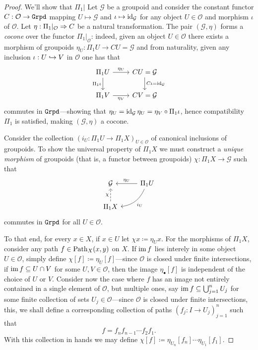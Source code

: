 \begin{proof}
We'll show that \(\Pi_1|\) Let \(\mathcal{G}\) be a groupoid and consider the
constant functor \(C: \mathcal{O} \to {\texttt{Grpd}}\) mapping \(U \mapsto \mathcal{G}\)
and \(\iota \mapsto \operatorname{id}_{\mathcal{G}}\) for any object \(U \in \mathcal{O}\) and
morphism \(\iota\) of \(\mathcal{O}\). Let \(\eta: \Pi_1|_{\mathcal{O}} \Rightarrow C\)
be a natural transformation. The pair \((\mathcal{G}, \eta)\) forms a
\emph{cocone} over the functor \(\Pi_1|_{\mathcal{O}}\): indeed, given an object
\(U \in \mathcal{O}\) there exists a morphism of groupoids
\(\eta_U: \Pi_1 U \to C U = \mathcal{G}\) and from naturality, given any
inclusion \(\iota: U \hookrightarrow V\) in \(\mathcal{O}\) one has that
\[
\begin{tikzcd}
\Pi_1 U \ar[d, "\Pi_1 \iota"'] \ar[r, "\eta_U"]
&C U = \mathcal{G} \ar[d, "C \iota = \Id_{\mathcal{G}}"] \\
\Pi_1 V \ar[r, "\eta_V"'] &C V = \mathcal{G}
\end{tikzcd}
\]
commutes in \({\texttt{Grpd}}\)---showing that
\(\eta_U = \operatorname{id}_{\mathcal{G}} \eta_U = \eta_V \circ \Pi_1 \iota\), hence
compatibility \(\Pi_1\) is satisfied, making \((\mathcal{G}, \eta)\) a cocone.

Consider the collection \((i_U: \Pi_1 U \to \Pi_1 X)_{U \in \mathcal{O}}\) of
canonical inclusions of groupoids. To show the universal property of \(\Pi_1 X\)
we must construct a \emph{unique morphism} of groupoids (that is, a functor
between groupoids) \(\chi: \Pi_1 X \to \mathcal{G}\) such that
\begin{equation}\label{eq:van-kampen-grpd}
\begin{tikzcd}
\mathcal{G} &\Pi_1 U \ar[l, "\eta_U"'] \ar[dl, bend left, "i_U"] \\
\Pi_1 X \ar[u, dashed, "\chi"] &
\end{tikzcd}
\end{equation}
commutes in \({\texttt{Grpd}}\) for all \(U \in \mathcal{O}\).

To that end, for every \(x \in X\), if \(x \in U\) let
\(\chi x \coloneq \eta_U x\). For the morphisms of \(\Pi_1 X\), consider any
path \(f \in \operatorname{Path}_X(x, y)\) on \(X\). If \(\operatorname{im} f\) lies interely in some object
\(U \in \mathcal{O}\), simply define \(\chi [f] \coloneq \eta_U [f]\)---since
\(\mathcal{O}\) is closed under finite intersections, if
\(\operatorname{im} f \subseteq U \cap V\) for some \(U, V \in \mathcal{O}\), then the image
\(\eta_{\bullet} [f]\) is independent of the choice of \(U\) or \(V\). Consider
now the case where \(f\) has an image not entirely contained in a single element
of \(\mathcal{O}\), but multiple ones, say
\(\operatorname{im} f \subseteq \bigcup_{j=1}^n U_j\) for some finite collection of sets
\(U_j \in \mathcal{O}\)---since \(\mathcal{O}\) is closed under finite
intersections, this, we shall define a corresponding collection of paths
\((f_j: I \to U_j)_{j=1}^n\) such that
\[
f = f_n f_{n-1} \cdots f_2 f_1.
\]
With this collection in hands we may define
\(\chi[f] \coloneq \eta_{U_n}[f_n] \cdots \eta_{U_1}[f_1]\).


\end{proof}
